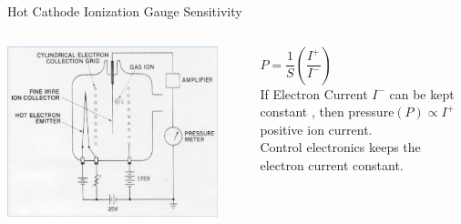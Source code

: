 \documentclass[11pt]{beamer}
\begin{document}
\begin{frame}{Hot Cathode Ionization Gauge Sensitivity}

\begin{columns}[t]
    
      
       \begin{exampleblock}{}
         \begin{center}
			\includegraphics[width=0.9\textwidth]{HotCathodeIonizationGauge.png}
		\end{center}
       \end{exampleblock}
       
       \begin{exampleblock}{ }
           $P=\dfrac{1}{S}(\dfrac{I^{+}}{I^{-}}) $ \\
           If  Electron Current $I^{-}$ can be kept constant , then pressure$(P) \propto  I^{+}$ positive ion current.\\
           Control electronics keeps the electron current constant.
       
       \end{exampleblock}   
   
    \end{columns}   





\end{frame}
\end{document}
